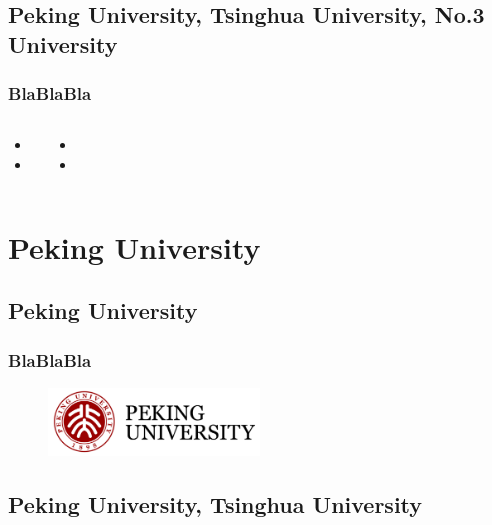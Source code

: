 \documentclass[hyperref={bookmarks=false},aspectratio=169]{beamer}
\begin{document}
     \subsection{Peking University, Tsinghua University, No.3 University}
\begin{frame}
	\frametitle{BlaBlaBla}

\begin{columns}
	

	\begin{itemize}
		\item 
		\item 
	\end{itemize}
	

	\begin{itemize}
		\item 
		\item 
	\end{itemize}
	
	\end{columns}

\end{frame}


		\section{Peking University}
		
		\subsection{Peking University}
	\begin{frame}
	\frametitle{BlaBlaBla}

\begin{figure}
    \centering
    \includegraphics[width=0.5\textwidth]{./figures/1}
\end{figure}

\end{frame}	
	
		\subsection{Peking University, Tsinghua University}
		
\end{document}
